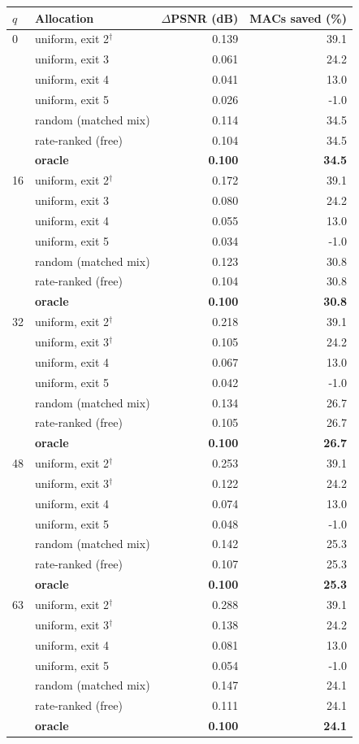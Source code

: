 \begin{tabular}{llrr}
\toprule
$q$ & Allocation & $\Delta$PSNR (dB) & MACs saved (\%) \\
\midrule
0 & uniform, exit 2$^{\dagger}$ & 0.139 & 39.1 \\
 & uniform, exit 3 & 0.061 & 24.2 \\
 & uniform, exit 4 & 0.041 & 13.0 \\
 & uniform, exit 5 & 0.026 & -1.0 \\
 & random (matched mix) & 0.114 & 34.5 \\
 & rate-ranked (free) & 0.104 & 34.5 \\
 & \textbf{oracle} & \textbf{0.100} & \textbf{34.5} \\
\midrule
16 & uniform, exit 2$^{\dagger}$ & 0.172 & 39.1 \\
 & uniform, exit 3 & 0.080 & 24.2 \\
 & uniform, exit 4 & 0.055 & 13.0 \\
 & uniform, exit 5 & 0.034 & -1.0 \\
 & random (matched mix) & 0.123 & 30.8 \\
 & rate-ranked (free) & 0.104 & 30.8 \\
 & \textbf{oracle} & \textbf{0.100} & \textbf{30.8} \\
\midrule
32 & uniform, exit 2$^{\dagger}$ & 0.218 & 39.1 \\
 & uniform, exit 3$^{\dagger}$ & 0.105 & 24.2 \\
 & uniform, exit 4 & 0.067 & 13.0 \\
 & uniform, exit 5 & 0.042 & -1.0 \\
 & random (matched mix) & 0.134 & 26.7 \\
 & rate-ranked (free) & 0.105 & 26.7 \\
 & \textbf{oracle} & \textbf{0.100} & \textbf{26.7} \\
\midrule
48 & uniform, exit 2$^{\dagger}$ & 0.253 & 39.1 \\
 & uniform, exit 3$^{\dagger}$ & 0.122 & 24.2 \\
 & uniform, exit 4 & 0.074 & 13.0 \\
 & uniform, exit 5 & 0.048 & -1.0 \\
 & random (matched mix) & 0.142 & 25.3 \\
 & rate-ranked (free) & 0.107 & 25.3 \\
 & \textbf{oracle} & \textbf{0.100} & \textbf{25.3} \\
\midrule
63 & uniform, exit 2$^{\dagger}$ & 0.288 & 39.1 \\
 & uniform, exit 3$^{\dagger}$ & 0.138 & 24.2 \\
 & uniform, exit 4 & 0.081 & 13.0 \\
 & uniform, exit 5 & 0.054 & -1.0 \\
 & random (matched mix) & 0.147 & 24.1 \\
 & rate-ranked (free) & 0.111 & 24.1 \\
 & \textbf{oracle} & \textbf{0.100} & \textbf{24.1} \\
\bottomrule
\end{tabular}
